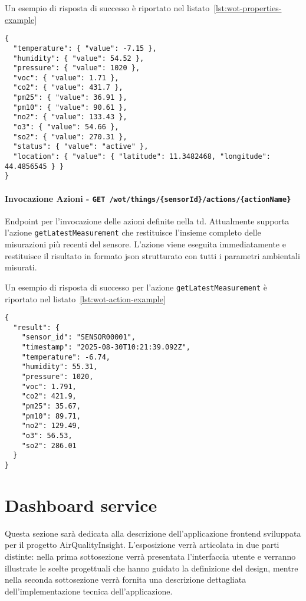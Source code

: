 Un esempio di risposta di successo è riportato nel listato~\ref{lst:wot-properties-example}
\begin{lstlisting}[caption={Risposta di successo per tutte le proprietà}, label=lst:wot-properties-example]
{
  "temperature": { "value": -7.15 },
  "humidity": { "value": 54.52 },
  "pressure": { "value": 1020 },
  "voc": { "value": 1.71 },
  "co2": { "value": 431.7 },
  "pm25": { "value": 36.91 },
  "pm10": { "value": 90.61 },
  "no2": { "value": 133.43 },
  "o3": { "value": 54.66 },
  "so2": { "value": 270.31 },
  "status": { "value": "active" },
  "location": { "value": { "latitude": 11.3482468, "longitude": 44.4856545 } }
}
\end{lstlisting}

\paragraph{Invocazione Azioni - \texttt{GET /wot/things/\{sensorId\}/actions/\{actionName\}}}

Endpoint per l'invocazione delle azioni definite nella \acrlong{td}.
Attualmente supporta l'azione \texttt{getLatestMeasurement} che restituisce l'insieme completo delle misurazioni
più recenti del sensore. L'azione viene eseguita immediatamente e restituisce il risultato in formato \acrshort{json}
strutturato con tutti i parametri ambientali misurati.

Un esempio di risposta di successo per l'azione \texttt{getLatestMeasurement} è riportato
nel listato~\ref{lst:wot-action-example}
\begin{lstlisting}[caption={Risposta di successo per azione \texttt{getLatestMeasurement}},
  label=lst:wot-action-example]
{
  "result": {
    "sensor_id": "SENSOR00001",
    "timestamp": "2025-08-30T10:21:39.092Z",
    "temperature": -6.74,
    "humidity": 55.31,
    "pressure": 1020,
    "voc": 1.791,
    "co2": 421.9,
    "pm25": 35.67,
    "pm10": 89.71,
    "no2": 129.49,
    "o3": 56.53,
    "so2": 286.01
  }
}

\end{lstlisting}

\section{Dashboard service}

Questa sezione sarà dedicata alla descrizione dell'applicazione frontend sviluppata per il progetto AirQualityInsight.
L'esposizione verrà articolata in due parti distinte: nella prima sottosezione verrà presentata
l'interfaccia utente e verranno illustrate le scelte progettuali che hanno guidato la definizione del design,
mentre nella seconda sottosezione verrà fornita una descrizione dettagliata dell'implementazione
tecnica dell'applicazione.

